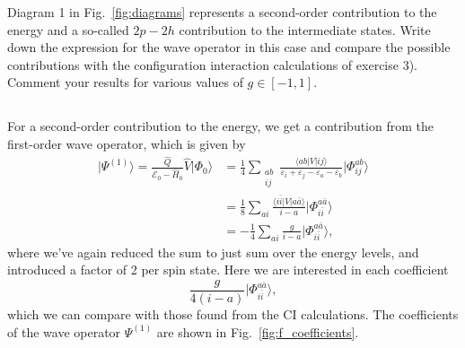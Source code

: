 Diagram 1 in Fig.~\ref{fig:diagrams} represents a second-order contribution to the energy and a so-called $2p-2h$ contribution to the intermediate states.
Write down the expression for the wave operator in this case and compare the possible contributions with the configuration interaction calculations of exercise 3). %
Comment your results for various values of $g \in [-1,1]$.

\subsection{}
For a second-order contribution to the energy, we get a contribution from the first-order wave operator, which is given by
\begin{align*}
    \vert \Psi^{(1)} \rangle
    = \frac{\hat{Q}}{\mathcal{E}_0 - \hat{H}_0} \hat{V} \vert \Phi_0 \rangle
    &= \frac{1}{4} \sum_{\substack{ab \\ ij}} \frac{\langle ab \vert V \vert ij \rangle}{\varepsilon_i + \varepsilon_j - \varepsilon_a - \varepsilon_b} \vert \Phi_{ij}^{ab} \rangle \\
    &= \frac{1}{8} \sum_{ai} \frac{\langle i\bar{i} \vert V \vert a\bar{a} \rangle}{i - a} \vert \Phi_{i\bar{i}}^{a\bar{a}} \rangle \\ %
    &= -\frac{1}{4} \sum_{ai} \frac{g}{i - a} \vert \Phi_{i\bar{i}}^{a\bar{a}} \rangle, %
\end{align*}
where we've again reduced the sum to just sum over the energy levels, and introduced a factor of 2 per spin state.
Here we are interested in each coefficient
\begin{equation*}
    \frac{g}{4(i - a)} \vert \Phi_{i\bar{i}}^{a\bar{a}} \rangle,
\end{equation*}
which we can compare with those found from the CI calculations.
The coefficients of the wave operator $\Psi^{(1)}$ are shown in Fig.~\ref{fig:f_coefficients}.

